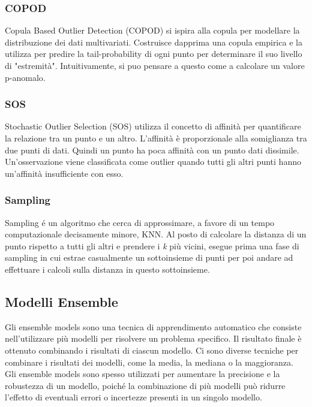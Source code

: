 \subsubsection{COPOD}
Copula Based Outlier Detection (COPOD) si ispira alla copula per modellare la distribuzione dei dati multivariati. Costruisce dapprima una copula empirica e la utilizza per predire la tail-probability di ogni punto per determinare il suo
livello di "estremità". Intuitivamente, si puo pensare a questo come a calcolare
un valore p-anomalo.

\subsubsection{SOS}
Stochastic Outlier Selection (SOS) utilizza il concetto di affinità per quantificare la relazione tra un punto e un altro. L'affinità è proporzionale alla somiglianza tra due punti di dati. Quindi un punto ha poca affinità con un punto dati dissimile. 
Un'osservazione viene classificata come outlier quando tutti gli altri punti hanno un'affinità insufficiente con esso.

\subsubsection{Sampling}
Sampling é un algoritmo che cerca di approssimare, a favore di un tempo computazionale decisamente minore, KNN. Al posto di calcolare la distanza di un punto rispetto a tutti gli altri e prendere i \textit{k} più vicini, esegue prima una fase di sampling in cui estrae casualmente un sottoinsieme di punti per poi andare ad effettuare i calcoli sulla distanza in questo sottoinsieme.

\subsection{Modelli Ensemble}
Gli ensemble models sono una tecnica di apprendimento automatico che consiste nell'utilizzare più modelli per risolvere un problema specifico. Il risultato finale è ottenuto combinando i risultati di ciascun modello. Ci sono diverse tecniche per combinare i risultati dei modelli, come la media, la mediana o la maggioranza. Gli ensemble models sono spesso utilizzati per aumentare la precisione e la robustezza di un modello, poiché la combinazione di più modelli può ridurre l'effetto di eventuali errori o incertezze presenti in un singolo modello.

